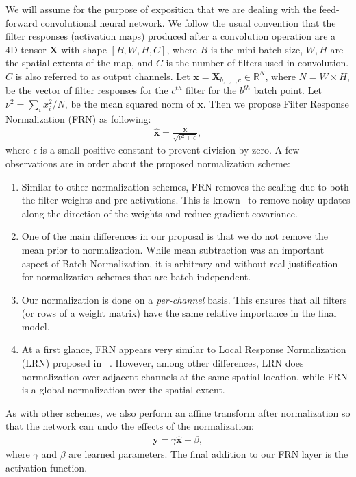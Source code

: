 \documentclass[10pt,twocolumn,letterpaper]{article}
\newcommand\R{\mathbb{R}}
\newcommand{\papername}{FRN}
\newcommand{\momentnorm}{FRN}
\begin{document}
We will assume for the purpose of exposition that we are dealing with the feed-forward convolutional neural network. We follow the usual convention that the filter responses (activation maps) produced after a convolution operation are a 4D tensor $\bm{X}$ with shape $[B, W, H, C]$, where $B$ is the mini-batch size, $W, H$ are the spatial extents of the map, and $C$ is the number of filters used in convolution. $C$ is also referred to as output channels. Let $\bm{x} = \bm{X}_{b,:,:,c} \in \R^{N}$, where $N = W \times H$, be the vector of filter responses for the $c^{th}$ filter for the $b^{th}$ batch point. 
Let $\nu^2 = \sum_i x_i^2/N$, be the mean squared norm of $\bm{x}$. Then we propose Filter Response Normalization (\momentnorm{}) as following:
\begin{align}
\label{eq:chan_norm}
\hat{\bm{x}} = \frac{\bm{x}}{\sqrt{\nu^2 + \epsilon}},
\end{align}
where $\epsilon$ is a small positive constant to prevent division by zero. A few observations are in order about the proposed normalization scheme:

\begin{enumerate}[leftmargin=*,noitemsep]
    \item Similar to other normalization schemes, FRN removes the scaling due to both the filter weights and pre-activations. This is known~\cite{salimans2016weight} to remove noisy updates along the direction of the weights and reduce gradient covariance.
    \item One of the main differences in our proposal is that we do not remove the mean prior to normalization. While mean subtraction was an important aspect of Batch Normalization, it is arbitrary and without real justification for normalization schemes that are batch independent.
    \item Our normalization is done on a \emph{per-channel} basis. This ensures that all filters (or rows of a weight matrix) have the same relative importance in the final model.
    \item At a first glance, FRN appears very similar to Local Response Normalization (LRN) proposed in ~\citet{Alexnet2012}. However, among other differences, LRN does normalization over adjacent channels at the same spatial location, while FRN is a global normalization over the spatial extent.
\end{enumerate}



As with other schemes, we also perform an affine transform after normalization so that the network can undo the effects of the normalization:
\begin{align}
\label{eq:affine_xform}
\bm{y} = \gamma \hat{\bm{x}} + \beta,
\end{align}
where $\gamma$ and $\beta$ are learned parameters. The final addition to our \papername{} layer is the activation function. 
\end{document}

